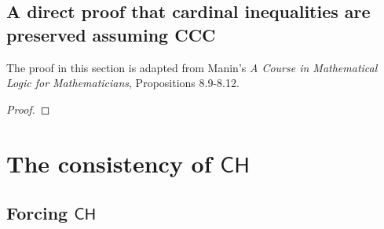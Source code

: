 \documentclass[11pt]{article}
\begin{document}
\subsection{A direct proof that cardinal inequalities are preserved assuming CCC}
The proof in this section is adapted from Manin's \emph{A Course in Mathematical Logic for Mathematicians}, Propositions 8.9-8.12.



\begin{proof}



\end{proof}

\section{The consistency of $\mathsf{CH}$}

\subsection{Forcing $\mathsf{CH}$}
\end{document}
